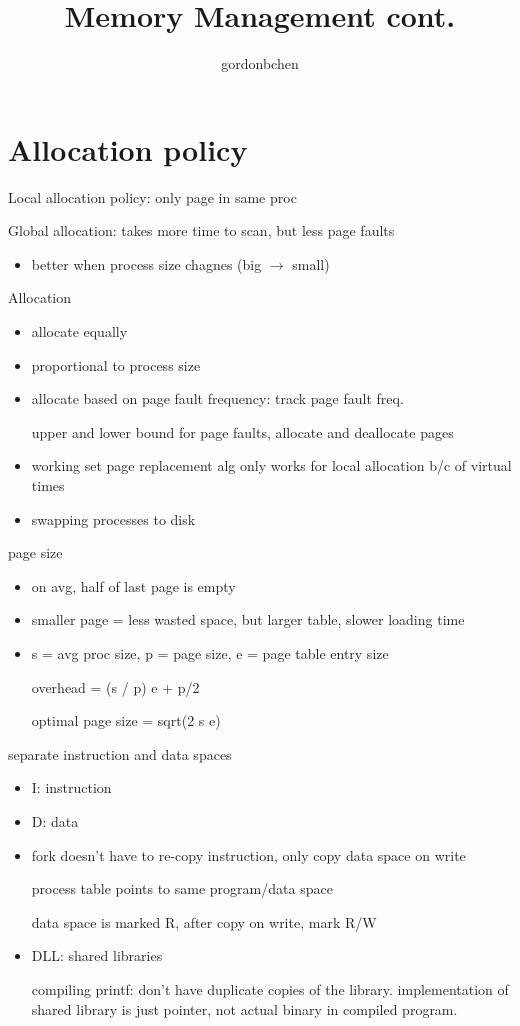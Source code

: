 \documentclass[11pt]{article}
\title{Memory Management cont.}
\author{gordonbchen}
\date{}
\begin{document}
\maketitle


\section{Allocation policy}

Local allocation policy: only page in same proc

Global allocation: takes more time to scan, but less page faults
\begin{itemize}
    \item better when process size chagnes (big $\to$ small)
\end{itemize}

Allocation 
\begin{itemize}
    \item allocate equally
    \item proportional to process size
    \item allocate based on page fault frequency: track page fault freq.

        upper and lower bound for page faults, allocate and deallocate pages

    \item working set page replacement alg only works for local allocation b/c of virtual times

    \item swapping processes to disk
\end{itemize}

page size
\begin{itemize}
    \item on avg, half of last page is empty
    \item smaller page = less wasted space, but larger table, slower loading time
    \item s = avg proc size, p = page size, e = page table entry size

        overhead = (s / p) e + p/2

        optimal page size = sqrt(2 s e)
\end{itemize}

separate instruction and data spaces
\begin{itemize}
    \item I: instruction
    \item D: data
    \item fork doesn't have to re-copy instruction, only copy data space on write

        process table points to same program/data space

        data space is marked R, after copy on write, mark R/W
    \item DLL: shared libraries

        compiling printf: don't have duplicate copies of the library. implementation of shared library
            is just pointer, not actual binary in compiled program.
\end{itemize}
\end{document}
